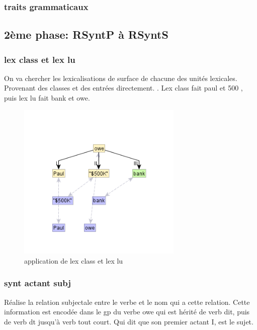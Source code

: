 \subsubsection{traits grammaticaux}


\subsection{2ème phase: RSyntP à RSyntS}

\subsubsection{lex class et lex lu}
On va chercher les lexicalisations de surface de chacune des unités lexicales. Provenant des classes et des entrées directement. . Lex class fait paul et 500 , puis lex lu fait bank et owe.
\begin{figure}[htb]
	\centering
	\includegraphics[width=0.7\textwidth, trim = {0cm 0cm 0cm 0cm},clip]{ch3/figs/rsyntslexicalisation1.png}
	\caption{application de lex class et lex lu}
	\label{fig:lexsurf}
\end{figure}

\subsubsection{synt actant subj}
Réalise la relation subjectale entre le verbe et le nom qui a cette relation. Cette information est encodée dans le gp du verbe owe qui est hérité de verb dit, puis de verb dt jusqu'à verb tout court. Qui dit que son premier actant I, est le sujet.

